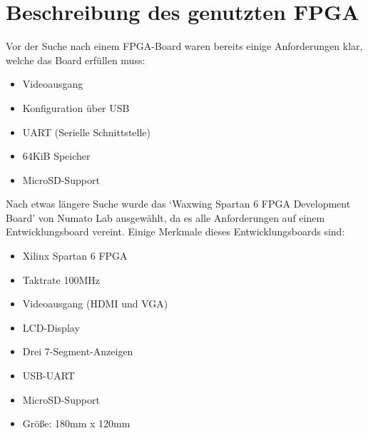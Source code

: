 \section{Beschreibung des genutzten FPGA}
Vor der Suche nach einem FPGA-Board waren bereits einige Anforderungen klar,
welche das Board erfüllen muss:
\begin{itemize}
	\item Videoausgang
	\item Konfiguration über USB
	\item \acs{UART} (Serielle Schnittstelle)
	\item 64KiB Speicher
	\item MicroSD-Support
\end{itemize}
Nach etwas längere Suche wurde das `Waxwing Spartan 6 FPGA Development Board'
von Numato Lab ausgewählt, da es alle Anforderungen auf einem Entwicklungsboard
vereint. Einige Merkmale dieses Entwicklungsboards sind:
\begin{itemize}
	\item Xilinx Spartan 6 FPGA
	\item Taktrate 100MHz
	\item Videoausgang (HDMI und VGA)
	\item LCD-Display
	\item Drei 7-Segment-Anzeigen
	\item USB-UART
	\item MicroSD-Support
	\item Größe: 180mm x 120mm
\end{itemize}

